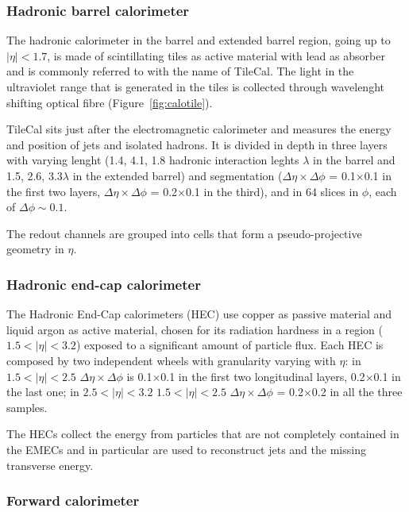 \subsubsection{Hadronic barrel calorimeter}\label{sec:hadcalbarrel}

The hadronic calorimeter in the barrel and extended barrel region, going up to
$|\eta|<1.7$, is made of scintillating tiles as active material with lead as absorber
and is commonly referred to with the name of TileCal. 
The light in the ultraviolet range that is generated in the tiles is collected through
wavelenght shifting optical fibre (Figure~\ref{fig:calotile}).

TileCal sits just after the electromagnetic
calorimeter and measures the energy and position of jets and isolated hadrons.
It is divided in depth in three layers with varying lenght (1.4, 4.1, 1.8 hadronic interaction
leghts $\lambda$ in the barrel and 1.5, 2.6, 3.3$\lambda$ in the extended barrel) and segmentation
($\Delta\eta\times\Delta\phi$ = 0.1$\times$0.1 in the first two layers,
$\Delta\eta\times\Delta\phi$ = 0.2$\times$0.1 in the third),
and in 64 slices in $\phi$, each of $\Delta\phi\sim0.1$.

The redout channels are grouped into cells that form a pseudo-projective geometry in $\eta$.

\subsubsection{Hadronic end-cap calorimeter}\label{sec:hadcalendcap}

The Hadronic End-Cap calorimeters (HEC) use copper as passive material and liquid
argon as active material, chosen for its radiation hardness in a region ($1.5<|\eta|<3.2$)
exposed to a significant amount of particle flux. Each HEC is composed by
two independent wheels with granularity varying with $\eta$: 
in $1.5<|\eta|<2.5$ $\Delta\eta\times\Delta\phi$ is 0.1$\times$0.1 in the first
two longitudinal layers,  0.2$\times$0.1 in the last one; in
$2.5<|\eta|<3.2$ $1.5<|\eta|<2.5$ $\Delta\eta\times\Delta\phi$ = 0.2$\times$0.2
in all the three samples.

The HECs collect the energy from particles that are not completely contained
in the EMECs and in particular are used to reconstruct jets and the missing transverse
energy.

\subsubsection{Forward calorimeter}\label{sec:calforward}

